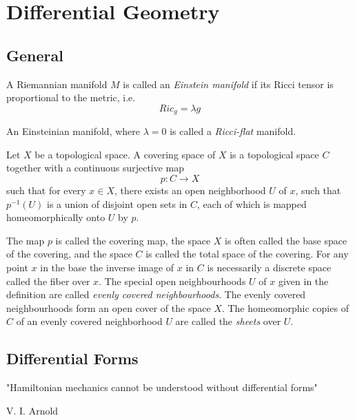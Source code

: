 \chapter{Differential Geometry}
\adjustmtc
\minitoc
\section{General}
\begin{definition}
A Riemannian manifold $M$ is called an \textit{Einstein manifold} if its Ricci tensor is proportional to the metric, i.e.
\begin{equation}
Ric_g = \lambda g
\end{equation}
\end{definition}
\begin{remark}
An Einsteinian manifold, where $\lambda=0$ is called a \textit{Ricci-flat} manifold.
\end{remark}
\begin{definition}
  Let $X$ be a topological space. A covering space of $X$ is a topological
  space $C$ together with a continuous surjective map
  \begin{equation}
    p : C\rightarrow X
  \end{equation}
  such that for every $x\in X$, there exists an open neighborhood $U$ of $x$,
  such that $p^{-1}(U)$ is a union of disjoint open sets in $C$, each of which
  is mapped homeomorphically onto $U$ by $p$.
\end{definition}
  The map $p$ is called the covering map, the space $X$ is often called the
  base space of the covering, and the space $C$ is called the total space of
  the covering. For any point $x$ in the base the inverse image of $x$ in $C$
  is necessarily a discrete space called the fiber over $x$. The special open
  neighbourhoods $U$ of $x$ given in the definition are called \textit{evenly
  covered neighbourhoods}. The evenly covered neighbourhoods form an open cover
  of the space $X$. The homeomorphic copies of $C$ of an evenly covered
  neighborhood
  $U$ are called the \textit{sheets} over $U$. 



\section{Differential Forms}
\epigraph{"Hamiltonian mechanics cannot be understood without differential
forms"}{V. I. Arnold}

